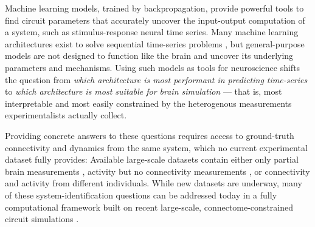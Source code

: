 \documentclass{article}
\begin{document}
Machine learning models, trained by backpropagation, provide powerful tools to find circuit parameters that accurately uncover the input-output computation of a system, such as stimulus-response neural time series. Many machine learning architectures exist to solve sequential time-series problems \citep{Elman1990-ar, Vaswani2017-wz, Gu2023-at, Krishnan2015-ri, Chen2018-gd}, but general-purpose models are not designed to function like the brain and uncover its underlying parameters and mechanisms. Using such models as tools for neuroscience shifts the question from \emph{which architecture is most performant in predicting time-series} to \emph{which architecture is most suitable for brain simulation} --- that is, most interpretable and most easily constrained by the heterogenous measurements experimentalists actually collect.

Providing concrete answers to these questions requires access to ground-truth connectivity and dynamics from the same system, which no current experimental dataset fully provides: Available large-scale datasets contain either only partial brain measurements \citep{MICrONS-Consortium2025-pt}, activity but no connectivity measurements \citep{Ahrens2013-rd, lueckmann_zapbench_2025}, or connectivity \citep{Dorkenwald2024-ni} and activity \citep{Currier2025-af} from different individuals. While new datasets are underway, many of these system-identification questions can be addressed today in a fully computational framework built on recent large-scale, connectome-constrained circuit simulations \citep{Lappalainen2024-tq, Shiu2024-rz}. 
\end{document}
